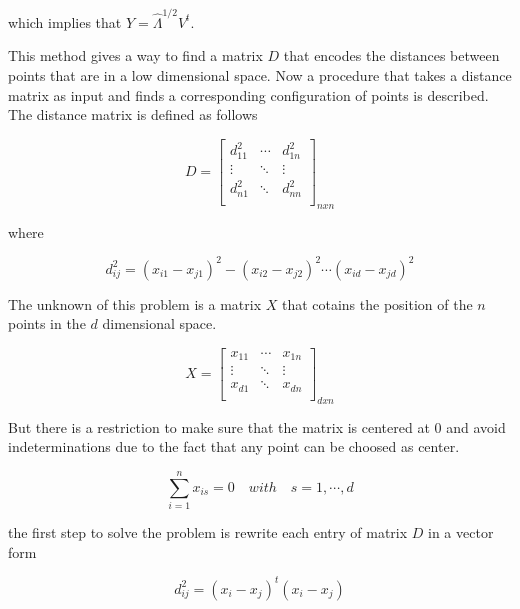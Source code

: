 \documentclass[12pt,journal]{IEEEtran}
\begin{document}
    which implies that $Y = \hat{\Lambda}^{1/2} V^t$.

    \vspace{0.25cm}

    This method gives a way to find a matrix $D$ that encodes the distances
    between points that are in a low dimensional space. Now a procedure that
    takes a distance matrix as input and finds a corresponding configuration
    of points is described. The distance matrix is defined as follows

    \[
        D =
        \begin{bmatrix}
            d_{11}^2 & \cdots & d_{1n}^2\\
            \vdots   & \ddots & \vdots  \\
            d_{n1}^2 & \ddots & d_{nn}^2\\
        \end{bmatrix}_{n x n}
    \]

    where

    \begin{equation*}
        d_{ij}^2 = (x_{i1}-x_{j1})^2 - (x_{i2}-x_{j2})^2 \cdots (x_{id}-x_{jd})^2
    \end{equation*}

    The unknown of this problem is a matrix $X$ that cotains the position of the
    $n$ points in the $d$ dimensional space.

    \[
        X =
        \begin{bmatrix}
            x_{11} & \cdots & x_{1n}\\
            \vdots & \ddots & \vdots\\
            x_{d1} & \ddots & x_{dn}\\
        \end{bmatrix}_{d x n}
    \]

    But there is a restriction to make sure that the matrix is centered at 0 and
    avoid indeterminations due to the fact that any point can be choosed as center.

    \begin{equation*}
        \sum_{i=1}^n x_{is} = 0 \quad with \quad s = 1, \cdots, d
    \end{equation*}

    the first step to solve the problem is rewrite each entry of matrix $D$ in
    a vector form

    \begin{equation*}
        d_{ij}^2 = (x_i-x_j)^t (x_i-x_j)
    \end{equation*}
\end{document}
